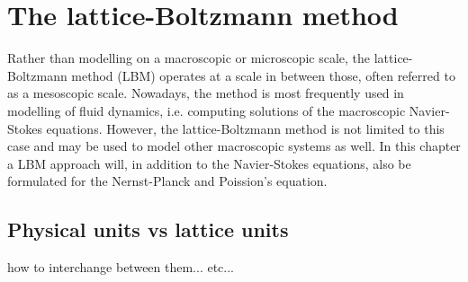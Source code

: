\chapter{The lattice-Boltzmann method}
Rather than modelling on a macroscopic or microscopic scale, the
lattice-Boltzmann method (LBM) operates at a scale in between those,
often referred to as a mesoscopic scale. Nowadays, the method is most
frequently used in modelling of fluid dynamics, i.e. computing
solutions of the macroscopic Navier-Stokes equations. However, the
lattice-Boltzmann method is not limited to this case and may be used
to model other macroscopic systems as well. In this chapter a LBM
approach will, in addition to the Navier-Stokes equations, also be
formulated for the Nernst-Planck and Poission's equation.























\section{Physical units vs lattice units}
how to interchange between them... etc...


